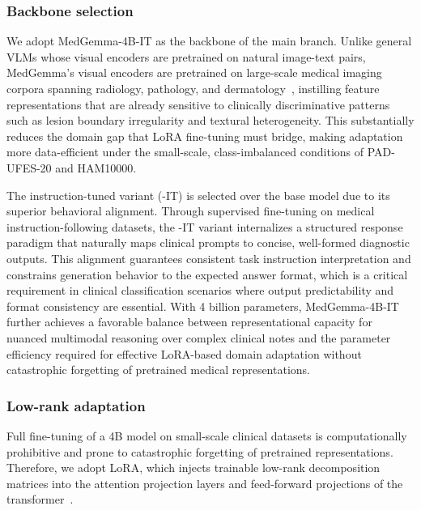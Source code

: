 \documentclass[preprint,12pt]{elsarticle}
\makeatletter
\def@NAT@last@yr{--\NAT@penalty}%
\makeatother
\begin{document}
\subsubsection{Backbone selection}
We adopt MedGemma-4B-IT as the backbone of the main branch. Unlike general VLMs whose visual encoders are pretrained on natural image-text pairs, MedGemma's visual encoders are pretrained on large-scale medical imaging corpora spanning radiology, pathology, and dermatology~\cite{sellergren2025medgemma}, instilling feature representations that are already sensitive to clinically discriminative patterns such as lesion boundary irregularity and textural heterogeneity. This substantially reduces the domain gap that LoRA fine-tuning must bridge, making adaptation more data-efficient under the small-scale, class-imbalanced conditions of PAD-UFES-20 and HAM10000.


The instruction-tuned variant (-IT) is selected over the base model due to its superior behavioral alignment. Through supervised fine-tuning on medical instruction-following datasets, the -IT variant internalizes a structured response paradigm that naturally maps clinical prompts to concise, well-formed diagnostic outputs. This alignment guarantees consistent task instruction interpretation and constrains generation behavior to the expected answer format, which is a critical requirement in clinical classification scenarios where output predictability and format consistency are essential. With 4 billion parameters, MedGemma-4B-IT further achieves a favorable balance between representational capacity for nuanced multimodal reasoning over complex clinical notes and the parameter efficiency required for effective LoRA-based domain adaptation without catastrophic forgetting of pretrained medical representations.

\subsubsection{Low-rank adaptation}
Full fine-tuning of a 4B model on small-scale clinical datasets is computationally prohibitive and prone to catastrophic forgetting of pretrained representations. 
Therefore, we adopt LoRA, which injects trainable low-rank decomposition matrices into the attention projection layers and feed-forward projections of the transformer~\cite{hu2022lora,houlsby2019parameter, lester2021power}. 
\end{document}

